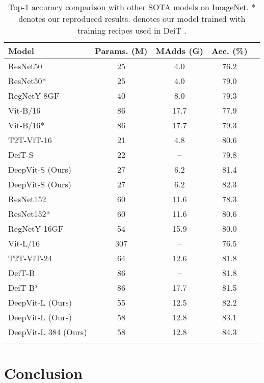 \documentclass[10pt,twocolumn,letterpaper]{article}
\begin{document}
\begin{table}[t]
\footnotesize
\caption{Top-1 accuracy comparison with other SOTA models on ImageNet. * denotes our reproduced results.  denotes our model trained with training recipes used in DeiT \cite{touvron2020training}. }
\label{tab:sota_comparison}
\centering
\begin{tabular}{lcccc}
\toprule
\bf Model
&\bf Params. (M)
&\bf MAdds (G)
&\bf Acc. (\%)
\\ \midrule ResNet50 \cite{he2016deep} & 25 & 4.0 & 76.2 \\
 ResNet50* & 25 & 4.0 & 79.0 \\
 RegNetY-8GF \cite{radosavovic2020designing} & 40 & 8.0 & 79.3 \\
 Vit-B/16 \cite{dosovitskiy2020image} & 86 & 17.7 & 77.9 \\
 Vit-B/16* & 86 & 17.7 & 79.3 \\
 T2T-ViT-16 \cite{yuan2021tokens} & 21 & 4.8 & 80.6 \\
 DeiT-S \cite{touvron2020training} & 22 & -- & 79.8 \\
\midrule
DeepVit-S (Ours) & 27  & 6.2 & 81.4 \\ 
  DeepVit-S (Ours) & 27  & 6.2 & 82.3 \\ 
\midrule
 ResNet152 \cite{he2016deep} & 60 & 11.6 & 78.3 \\
 ResNet152* & 60 & 11.6 & 80.6 \\
 RegNetY-16GF \cite{radosavovic2020designing} & 54 & 15.9 & 80.0 \\
 Vit-L/16 \cite{dosovitskiy2020image} & 307 & -- & 76.5 \\
 T2T-ViT-24 \cite{yuan2021tokens} & 64 & 12.6 & 81.8 \\
 DeiT-B \cite{touvron2020training} & 86 & -- & 81.8 \\
 DeiT-B* & 86 & 17.7 & 81.5 \\
\midrule
DeepVit-L (Ours) & 55  & 12.5 & 82.2 \\ 
 DeepVit-L (Ours) & 58  & 12.8 & 83.1 \\ 
 DeepVit-L 384 (Ours) & 58  & 12.8 & 84.3 \\ 
\bottomrule
\vspace{-5mm}
\end{tabular}
\end{table}




%
 




\section{Conclusion}
\end{document}
